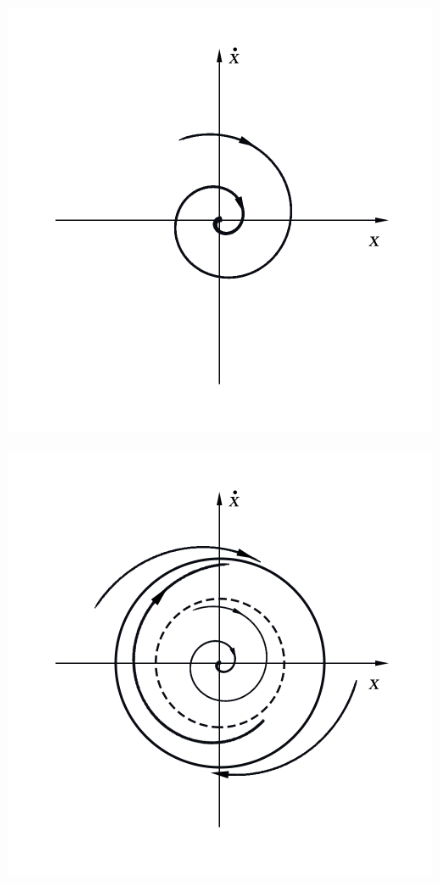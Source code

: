 \begin{center}
    \begin{figure}[H]
        \begin{minipage}{0.32\linewidth}
            \includegraphics[width=\linewidth]{pics/Ris10a.png} 
            \vspace{-30pt}
            \label{fig:10}
        \end{minipage}
    \begin{minipage}{0.32\linewidth}
        \includegraphics[width=\linewidth]{pics/Ris10b.png} 

\end{minipage}
\end{figure}
\end{center}
